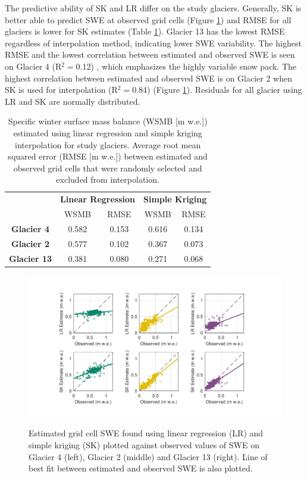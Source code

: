 \documentclass[twocolumn,letterpaper]{igs}
\begin{document}
The predictive ability of SK and LR differ on the study glaciers. Generally, SK is better able to predict SWE at observed grid cells (Figure \ref{fig:observedVSestimated_S2}) and RMSE for all glaciers is lower for SK estimates (Table \ref{tab:WSMB&RMSE}). Glacier 13 has the lowest RMSE regardless of interpolation method, indicating lower SWE variability. The highest RMSE and the lowest correlation between estimated and observed SWE is seen on Glacier 4 (R$^2=$0.12) , which emphasizes the highly variable snow pack.  The highest correlation between estimated and observed SWE is on Glacier 2 when SK is used for interpolation (R$^2=$0.84) (Figure \ref{fig:observedVSestimated_S2}). Residuals for all glacier using LR and SK are normally distributed.

\begin{table}[]
\centering
\caption{Specific winter surface mass balance (WSMB [m w.e.]) estimated using linear regression and simple kriging interpolation for study glaciers. Average root mean squared error (RMSE [m w.e.]) between estimated and observed grid cells that were randomly selected and excluded from interpolation.}
\label{tab:WSMB&RMSE}
\begin{tabular}{ccccc}
 & \multicolumn{2}{c}{\textbf{Linear Regression}} & \multicolumn{2}{c}{\textbf{Simple Kriging}} \\
 & WSMB & RMSE & WSMB & RMSE \\
  \midrule
\textbf{Glacier 4} & 0.582 & 0.153 & 0.616 & 0.134 \\
 \midrule
\textbf{Glacier 2} & 0.577 & 0.102 & 0.367 & 0.073 \\
 \midrule
\textbf{Glacier 13} & 0.381 & 0.080 & 0.271 & 0.068
\end{tabular}
\end{table}

\begin{figure}
	\centering
	\includegraphics[width =\textwidth]{observedVSestimated_S2.pdf}\\
	\caption{Estimated grid cell SWE found using linear regression (LR) and simple kriging (SK) plotted against observed values of SWE on Glacier 4 (left), Glacier 2 (middle) and Glacier 13 (right). Line of best fit between estimated and observed SWE is also plotted.}
	\label{fig:observedVSestimated_S2}
\end{figure}
\end{document}
